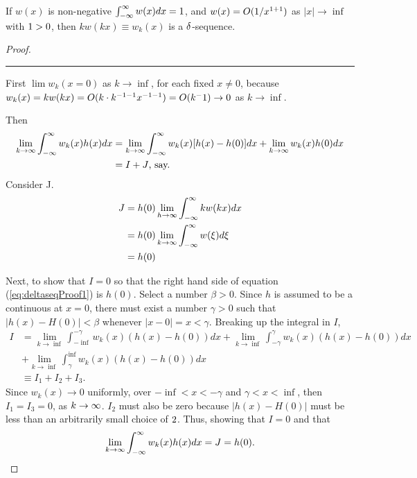 \begin{theorem}
    If \(w(x)\) is non-negative \(\int_{-\infty}^{\infty} w(x) dx = 1\), and \(w(x)=O(1/x^{1+1})\) as \(|x| \rightarrow \inf\) with \(1>0\), then \(kw(kx) \equiv w_k(x)\) is a \(\delta\)-sequence.
\end{theorem}
\begin{proof}
    \noindent\rule{\textwidth}{1pt}
    
    First \(\lim w_k(x=0)\) as \(k \rightarrow \inf\), for each fixed \(x \neq 0\), because \(w_k(x)=kw(kx)=O(k\cdot k^{-1-1} x^{-1-1}) = O(k^-1) \rightarrow 0\) as \(k \rightarrow \inf\). 
    
    Then 
    \begin{equation}\label{eq:deltaseqProof1}
        \begin{split}
            \lim_{k\rightarrow \infty}\int_{-\infty}^{\infty} w_k(x)h(x) dx &= \lim_{k\rightarrow\infty} \int_{-\infty}^{\infty} w_k(x)[h(x)-h(0)]dx + \lim_{k\rightarrow\infty} w_k(x)h(0)dx\\
            &=I + J\text{, say.}
        \end{split}
    \end{equation}
    Consider J.
    \begin{equation}
        \begin{split}
            J &= h(0) \lim_{h\rightarrow\infty} \int_{-\infty}^{\infty} kw(kx)dx\\
            &=h(0)\lim_{k\rightarrow \infty} \int_{-\infty}^{\infty} w(\xi) d\xi\\
            &= h(0)
        \end{split}
    \end{equation}

    Next, to show that \(I=0\) so that the right hand side of equation (\ref{eq:deltaseqProof1}) is \(h(0)\). Select a number \(\beta > 0\). Since \(h\) is assumed to be a continuous at \(x=0\), there must exist a number \(\gamma>0\) such that \(|h(x)-H(0)|<\beta\) whenever \(|x-0|=x<\gamma\). Breaking up the integral in \(I\),
    \begin{equation}
        \begin{split}
            I &= \lim_{k\rightarrow \inf} \int_{-\inf}^{-\gamma} w_k(x)(h(x)-h(0)) dx + \lim_{k\rightarrow \inf} \int_{-\gamma}^{\gamma} w_k(x)(h(x)-h(0)) dx \\ & + \lim_{k\rightarrow \inf} \int_{\gamma}^{\inf} w_k(x)(h(x)-h(0)) dx\\
            &\equiv I_1 + I_2 + I_3.
        \end{split}
    \end{equation}
    Since \(w_k(x)\rightarrow 0\) uniformly, over \(-\inf< x < -\gamma\) and \(\gamma < x < \inf \), then \(I_1=I_3 =0\), as \(k \-> \inf\). \(I_2\) must also be zero because \(|h(x)-H(0)|\) must be less than an arbitrarily small choice of \(2\). Thus, showing that \(I=0\) and that 
    \begin{equation}
        \lim_{k\rightarrow \infty}\int_{-\infty}^{\infty} w_k(x)h(x) dx = J = h(0).
    \end{equation}
\end{proof}

